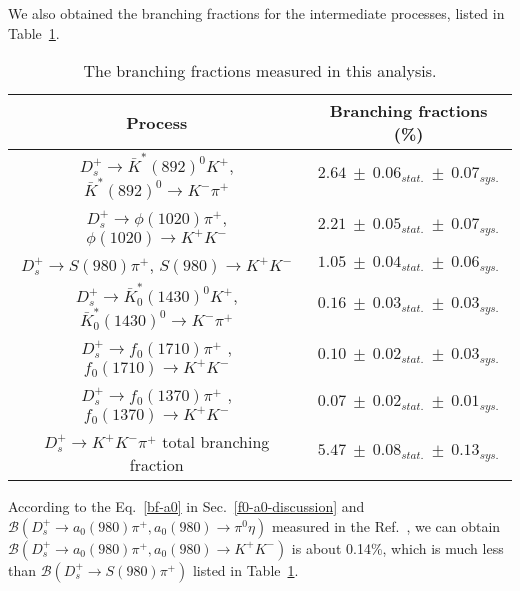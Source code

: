 {    We also obtained the branching fractions for the intermediate processes, listed in Table~\ref{total-BF}.
    \begin{table}[htbp]
        \caption{The branching fractions measured in this analysis.}
        \label{total-BF}
        \begin{center}
            \begin{tabular}{cc}
                \toprule\toprule
                Process & Branching fractions (\%)\\
                \hline
                $D_{s}^{+} \rightarrow \bar{K}^{*}(892)^{0}K^{+}$, $\bar{K}^{*}(892)^{0} \rightarrow K^{-}\pi^{+}$              & $2.64\ \pm\ 0.06_{stat.}\ \pm\ 0.07_{sys.}$  \\
                $D_{s}^{+} \rightarrow \phi(1020)\pi^{+}$, $\phi(1020) \rightarrow K^{+}K^{-}$                                  & $2.21\ \pm\ 0.05_{stat.}\ \pm\ 0.07_{sys.}$  \\
                $D_{s}^{+} \rightarrow S(980)\pi^{+}$, $S(980) \rightarrow K^{+}K^{-}$                                          & $1.05\ \pm\ 0.04_{stat.}\ \pm\ 0.06_{sys.}$  \\
                $D_{s}^{+} \rightarrow \bar{K}^{*}_{0}(1430)^{0}K^{+}$, $\bar{K}^{*}_{0}(1430)^{0} \rightarrow K^{-}\pi^{+}$    & $0.16\ \pm\ 0.03_{stat.}\ \pm\ 0.03_{sys.}$  \\
                $D_{s}^{+} \rightarrow f_{0}(1710)\pi^{+}$ ,$f_{0}(1710) \rightarrow K^{+}K^{-}$                                & $0.10\ \pm\ 0.02_{stat.}\ \pm\ 0.03_{sys.}$  \\
                $D_{s}^{+} \rightarrow f_{0}(1370)\pi^{+}$ ,$f_{0}(1370) \rightarrow K^{+}K^{-}$                                & $0.07\ \pm\ 0.02_{stat.}\ \pm\ 0.01_{sys.}$  \\
                $D_{s}^{+} \rightarrow K^{+}K^{-}\pi^{+}$ total branching fraction                                              & $5.47\ \pm\ 0.08_{stat.}\ \pm\ 0.13_{sys.}$ \\
                \bottomrule\bottomrule
            \end{tabular}
        \end{center}
    \end{table}
    According to the Eq.~\ref{bf-a0} in Sec.~\ref{f0-a0-discussion} and $\mathcal{B}(D_{s}^{+} \rightarrow a_{0}(980)\pi^{+}, a_{0}(980) \rightarrow \pi^{0}\eta)$ measured in the Ref.~\cite{Doc-DB-682-v7}, we can obtain $\mathcal{B}(D_{s}^{+} \rightarrow a_{0}(980)\pi^{+}, a_{0}(980) \rightarrow K^{+}K^{-})$ is about 0.14\%, which is much less than $\mathcal{B}(D_{s}^{+} \rightarrow S(980)\pi^{+})$ listed in Table~\ref{total-BF}. 
}
